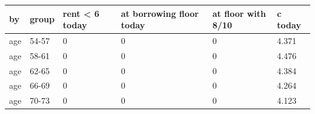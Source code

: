 \begingroup\small
\setlength{\tabcolsep}{3pt}
\renewcommand{\arraystretch}{1.04}
\begin{tabularx}{\linewidth}{XXXXXX}
\toprule
by & group & rent \textless{} 6 today & at borrowing floor today & at floor with 8/10 & c today \\
\midrule
age & 54-57 & 0 & 0 & 0 & 4.371 \\
age & 58-61 & 0 & 0 & 0 & 4.476 \\
age & 62-65 & 0 & 0 & 0 & 4.384 \\
age & 66-69 & 0 & 0 & 0 & 4.264 \\
age & 70-73 & 0 & 0 & 0 & 4.123 \\
\bottomrule
\end{tabularx}
\endgroup
